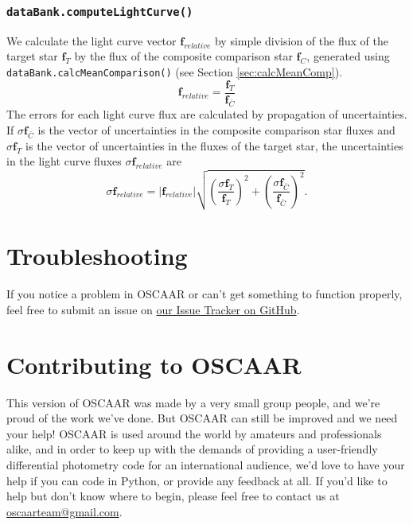 \documentclass[a4paper]{article}
\newcommand{\code}[1]{\texttt{#1}}
\begin{document}
\subsubsection{\code{dataBank.computeLightCurve()}} \label{sec:computeLightCurve}
We calculate the light curve vector $\mathbf{f}_{relative}$ by simple division of the flux of the target star $\mathbf{f}_{T}$ by the flux of the composite comparison star $\mathbf{f}_{C}$, generated using \code{dataBank.calcMeanComparison()} (see Section \ref{sec:calcMeanComp}).
\begin{equation}
\mathbf{f}_{relative}  = \frac{\mathbf{f}_{T}}{\mathbf{f}_{\bar{C}}}
\end{equation}
The errors for each light curve flux are calculated by propagation of uncertainties. If $\sigma \mathbf{f}_{\bar{C}}$ is the vector of uncertainties in the composite comparison star fluxes and $\sigma \mathbf{f}_{T}$ is the vector of uncertainties in the fluxes of the target star, the uncertainties in the light curve fluxes $\sigma \mathbf{f}_{relative}$ are
\begin{equation}
\sigma \mathbf{f}_{relative}  = | \mathbf{f}_{relative} |  \sqrt{ \left(\frac{\sigma \mathbf{f}_{T}}{\mathbf{f}_{T}} \right)^2 + \left(\frac{\sigma \mathbf{f}_{\bar{C}}}{\mathbf{f}_{\bar{C}}} \right)^2 }.
\end{equation}

\section{Troubleshooting} \label{sec:issues}
If you notice a problem in OSCAAR or can't get something to function properly, feel free to submit an issue on \href{https://github.com/OSCAAR/OSCAAR/issues?state=open}{our Issue Tracker on GitHub}. 

\section{Contributing to OSCAAR}
This version of OSCAAR was made by a very small group people, and we're proud of the work we've done. But OSCAAR can still be improved and we need your help! OSCAAR is used around the world by amateurs and professionals alike, and in order to keep up with the demands of providing a user-friendly differential photometry code for an international audience, we'd love to have your help if you can code in Python, or provide any feedback at all. If you'd like to help but don't know where to begin, please feel free to contact us at \href{mailto:oscaarteam@gmail.com}{oscaarteam@gmail.com}. 
\end{document}
